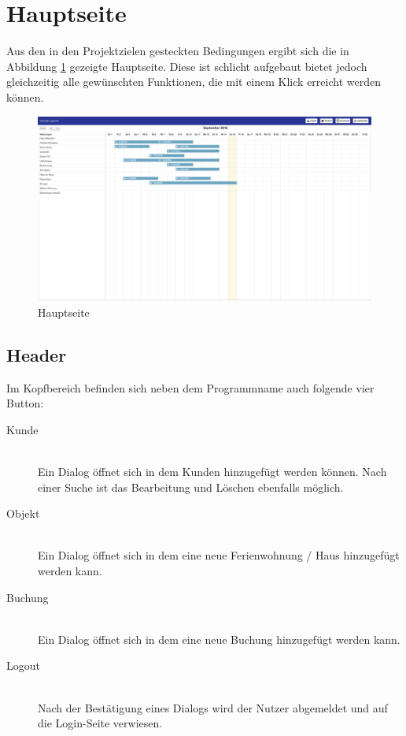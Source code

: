 \section{Hauptseite}
Aus den in den Projektzielen gesteckten Bedingungen ergibt sich die in Abbildung \ref{frontend_mainpage} gezeigte Hauptseite. Diese ist schlicht aufgebaut bietet jedoch gleichzeitig alle gewünschten Funktionen, die mit einem Klick erreicht werden können.

\begin{figure}[H]
\centering\includegraphics[width=1\textwidth]{images/frontend_mainpage.png}
\caption{Hauptseite}
\label{frontend_mainpage}
\end{figure}

\subsection{Header}
Im Kopfbereich befinden sich neben dem Programmname auch folgende vier Button:

\begin{description}
\item[Kunde]\hfill \\
Ein Dialog öffnet sich in dem Kunden hinzugefügt werden können. Nach einer Suche ist das Bearbeitung und Löschen ebenfalls möglich.
\item[Objekt]\hfill \\ 
Ein Dialog öffnet sich in dem eine neue Ferienwohnung / Haus hinzugefügt werden kann. 
\item[Buchung]\hfill \\ 
Ein Dialog öffnet sich in dem eine neue Buchung hinzugefügt werden kann. 
\item[Logout]\hfill \\ 
Nach der Bestätigung eines Dialogs wird der Nutzer abgemeldet und auf die Login-Seite verwiesen. 
\end{description}

